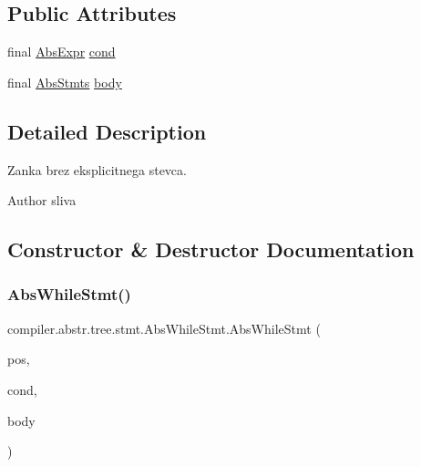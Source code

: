 \subsection*{Public Attributes}
\begin{DoxyCompactItemize}
\item 
final \hyperlink{classcompiler_1_1abstr_1_1tree_1_1expr_1_1_abs_expr}{Abs\+Expr} \hyperlink{classcompiler_1_1abstr_1_1tree_1_1stmt_1_1_abs_while_stmt_a1a49a7895323e9416d54518e5ad81f02}{cond}
\item 
final \hyperlink{classcompiler_1_1abstr_1_1tree_1_1_abs_stmts}{Abs\+Stmts} \hyperlink{classcompiler_1_1abstr_1_1tree_1_1stmt_1_1_abs_while_stmt_ad8d10bacbdb4e81afd46cd3861cab123}{body}
\end{DoxyCompactItemize}


\subsection{Detailed Description}
Zanka brez eksplicitnega stevca.

\begin{DoxyAuthor}{Author}
sliva 
\end{DoxyAuthor}


\subsection{Constructor \& Destructor Documentation}
\mbox{\label{classcompiler_1_1abstr_1_1tree_1_1stmt_1_1_abs_while_stmt_a321c0595d77243ea8a91e6676f19da5f}} 
\subsubsection{\texorpdfstring{Abs\+While\+Stmt()}{AbsWhileStmt()}}
{\footnotesize\ttfamily compiler.\+abstr.\+tree.\+stmt.\+Abs\+While\+Stmt.\+Abs\+While\+Stmt (\begin{DoxyParamCaption}\item[{\hyperlink{classcompiler_1_1_position}{Position}}]{pos,  }\item[{\hyperlink{classcompiler_1_1abstr_1_1tree_1_1expr_1_1_abs_expr}{Abs\+Expr}}]{cond,  }\item[{\hyperlink{classcompiler_1_1abstr_1_1tree_1_1_abs_stmts}{Abs\+Stmts}}]{body }\end{DoxyParamCaption})}

